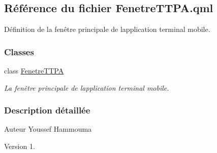 \hypertarget{_fenetre_t_t_p_a_8qml}{}\subsection{Référence du fichier Fenetre\+T\+T\+P\+A.\+qml}
\label{_fenetre_t_t_p_a_8qml}


Définition de la fenêtre principale de l\textquotesingle{}application terminal mobile.  


\subsubsection*{Classes}
\begin{DoxyCompactItemize}
\item 
class \hyperlink{class_fenetre_t_t_p_a}{Fenetre\+T\+T\+PA}
\begin{DoxyCompactList}\small\item\em La fenêtre principale de l\textquotesingle{}application terminal mobile. \end{DoxyCompactList}\end{DoxyCompactItemize}


\subsubsection{Description détaillée}
\begin{DoxyAuthor}{Auteur}
Youssef Hammouma
\end{DoxyAuthor}
\begin{DoxyVersion}{Version}
1. 
\end{DoxyVersion}
